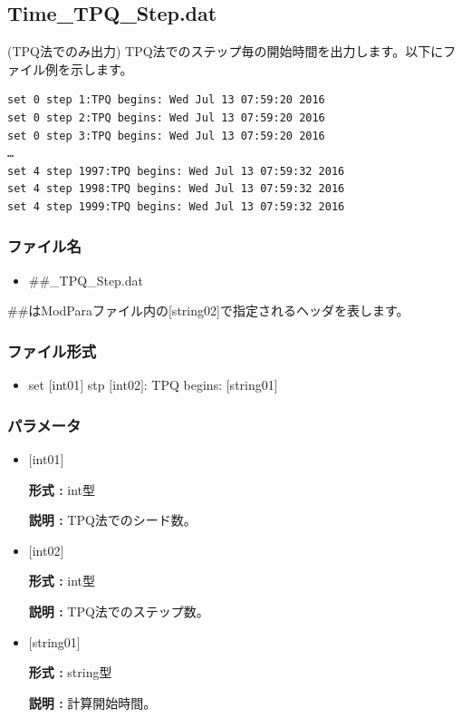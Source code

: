 \newpage
\subsection{Time\_TPQ\_Step.dat}
(TPQ法でのみ出力) TPQ法でのステップ毎の開始時間を出力します。以下にファイル例を示します。\\
\begin{minipage}{15cm}
\begin{screen}
\begin{verbatim}
set 0 step 1:TPQ begins: Wed Jul 13 07:59:20 2016
set 0 step 2:TPQ begins: Wed Jul 13 07:59:20 2016
set 0 step 3:TPQ begins: Wed Jul 13 07:59:20 2016
…
set 4 step 1997:TPQ begins: Wed Jul 13 07:59:32 2016
set 4 step 1998:TPQ begins: Wed Jul 13 07:59:32 2016
set 4 step 1999:TPQ begins: Wed Jul 13 07:59:32 2016
\end{verbatim}
\end{screen}
\end{minipage}

\subsubsection{ファイル名}
 \begin{itemize}
   \item  \#\#\_TPQ\_Step.dat
  \end{itemize}
  \#\#はModParaファイル内の[string02]で指定されるヘッダを表します。


\subsubsection{ファイル形式}
 \begin{itemize}
   \item set $[$int01$]$ stp $[$int02$]$: TPQ begins: $[$string01$]$
  \end{itemize}
\subsubsection{パラメータ}
 \begin{itemize}

  \item  $[$int01$]$
  
 {\bf 形式 :} int型

{\bf 説明 :} TPQ法でのシード数。
 
  \item  $[$int02$]$
  
 {\bf 形式 :} int型

{\bf 説明 :} TPQ法でのステップ数。

  \item  $[$string01$]$
  
 {\bf 形式 :} string型

{\bf 説明 :} 計算開始時間。

 \end{itemize}

